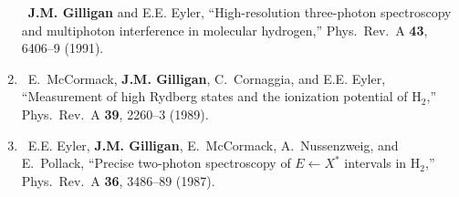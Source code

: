 \begin{enumerate}
    \textdagger\ 
    \textbf{J.M. Gilligan} and E.E. Eyler, 
    \enquote{High-resolution three-photon spectroscopy and multiphoton interference in molecular hydrogen,}  
    Phys.\ Rev.\ A \textbf{43}, 6406--9 (1991). 
%	
    \item
    \textdagger\ 
    E.~McCormack, \textbf{J.M. Gilligan}, C.~Cornaggia, and E.E. Eyler,
    \enquote{Measurement of high Rydberg states and the ionization potential of {H$_2$},}  
    Phys.\ Rev.\ A \textbf{39}, 2260--3 (1989). 
%	
\iffalse
    \item
    E.F. McCormack, E.E. Eyler, and \textbf{J.M. Gilligan}, 
    \enquote{Precise photodissociation and multiphoton spectroscopy of $\H_2$},
    J. Opt. Soc. B Opt. Phys.\ \textbf{4}, 80 (1987).  
\fi
%	
    \item
    \textdagger\
    E.E. Eyler, \textbf{J.M. Gilligan}, E.~McCormack, A.~Nussenzweig, and E.~Pollack, 
    \enquote{Precise two-photon spectroscopy of {$E\leftarrow X^*$} intervals in {H$_2$},}  
    Phys.\ Rev.\ A \textbf{36}, 3486--89 (1987).  
%
\end{enumerate}


